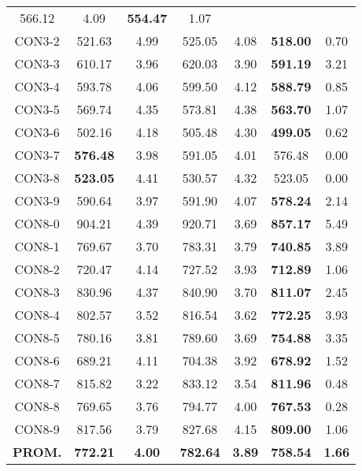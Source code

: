 \begin{table}[ht]
\begin{tabular}{c c c c c c c}
566.12 & 4.09 & \bf{554.47} & 
1.07\\CON3-2 & 521.63 & 4.99 & 
525.05 & 4.08 & \bf{518.00} & 
0.70\\CON3-3 & 610.17 & 3.96 & 
620.03 & 3.90 & \bf{591.19} & 
3.21\\CON3-4 & 593.78 & 4.06 & 
599.50 & 4.12 & \bf{588.79} & 
0.85\\CON3-5 & 569.74 & 4.35 & 
573.81 & 4.38 & \bf{563.70} & 
1.07\\CON3-6 & 502.16 & 4.18 & 
505.48 & 4.30 & \bf{499.05} & 
0.62\\CON3-7 & \bf{576.48} & 3.98 & 
591.05 & 4.01 & 576.48 & 0.00\\
CON3-8 & \bf{523.05} & 4.41 & 
530.57 & 4.32 & 523.05 & 0.00\\
CON3-9 & 590.64 & 3.97 & 
591.90 & 4.07 & \bf{578.24} & 
2.14\\CON8-0 & 904.21 & 4.39 & 
920.71 & 3.69 & \bf{857.17} & 
5.49\\CON8-1 & 769.67 & 3.70 & 
783.31 & 3.79 & \bf{740.85} & 
3.89\\CON8-2 & 720.47 & 4.14 & 
727.52 & 3.93 & \bf{712.89} & 
1.06\\CON8-3 & 830.96 & 4.37 & 
840.90 & 3.70 & \bf{811.07} & 
2.45\\CON8-4 & 802.57 & 3.52 & 
816.54 & 3.62 & \bf{772.25} & 
3.93\\CON8-5 & 780.16 & 3.81 & 
789.60 & 3.69 & \bf{754.88} & 
3.35\\CON8-6 & 689.21 & 4.11 & 
704.38 & 3.92 & \bf{678.92} & 
1.52\\CON8-7 & 815.82 & 3.22 & 
833.12 & 3.54 & \bf{811.96} & 
0.48\\CON8-8 & 769.65 & 3.76 & 
794.77 & 4.00 & \bf{767.53} & 
0.28\\CON8-9 & 817.56 & 3.79 & 
827.68 & 4.15 & \bf{809.00} & 
1.06\\\bf{PROM.} & 
\bf{772.21} & \bf{4.00} & \bf{782.64} & \bf{3.89} & \bf{758.54} & \bf{1.66}\\[1ex]\hline
\end{tabular}
\label{table:nonlin}
\end{table} \clearpage
